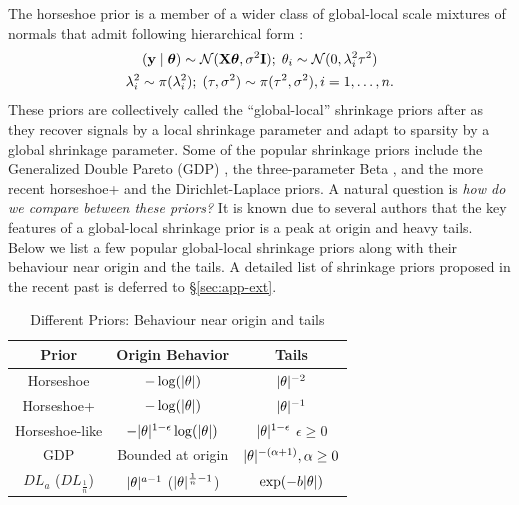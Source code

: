 \documentclass[11pt]{article}
\begin{document}
%
The horseshoe prior is a member of a wider class of global-local scale mixtures of normals that admit following hierarchical form \citep{polson2010shrink}: 
\begin{gather*}
({\bf y} \mid \boldsymbol{\theta}) \sim {\cal N}({\bf X} \boldsymbol{\theta}, \sigma^2 {\bf I}) ;\; \theta_i \sim {\cal N}(0, \lambda_i^2 \tau^2) \\
\lambda_i^2 \sim \pi(\lambda_i^2) ; \; (\tau,\sigma^2) \sim  \pi(\tau^2,\sigma^2), i = 1, \ldots, n. 
\end{gather*}
These priors are collectively called the ``global-local'' shrinkage priors after \cite{polson2010shrink} as they recover signals by a local shrinkage parameter and adapt to sparsity by a global shrinkage parameter. Some of the popular shrinkage priors include the Generalized Double Pareto (GDP) \citep{armagan2013generalized}, the three-parameter Beta \citep{armagan2011generalized}, and the more recent horseshoe+ \citep{bhadra2015horseshoe+} and the Dirichlet-Laplace \citep{bhattacharya2014dirichlet} priors. A natural question is \textit{how do we compare between these priors?} It is known due to several authors \citep[e.g.]{polson2010shrink,bhadra2015default,van2015conditions} that the key features of a global-local shrinkage prior is a peak at origin and heavy tails. Below we list a few popular global-local shrinkage priors along with their behaviour near origin and the tails. A detailed list of shrinkage priors proposed in the recent past is deferred to \S \ref{sec:app-ext}.

\begin{table}%
\centering
\begin{tabular}{| c | c |c |}
\hline
Prior & Origin Behavior & Tails \\
\hline 
Horseshoe & $-\log(\lvert\theta\rvert)$ & $\lvert\theta\rvert^{-2}$ \\
Horseshoe+ & $-\log(\lvert\theta\rvert)$ & $\lvert\theta\rvert^{-1}$ \\
Horseshoe-like & $-\lvert\theta\rvert^{1-\epsilon}\log(\lvert\theta\rvert)$ & $\lvert\theta\rvert^{1-\epsilon}$ $\epsilon \ge 0$\\
GDP & Bounded at origin & $\lvert\theta\rvert^{-(\alpha + 1)}, \alpha \ge 0$ \\
$DL_{a}$ ($DL_{\frac{1}{n}}$) & $\lvert\theta\rvert^{a-1}$ ($\lvert\theta\rvert^{\frac{1}{n}-1}$) & $\exp(-b\lvert\theta\rvert)$ \\
\hline
\end{tabular}
\caption{Different Priors: Behaviour near origin and tails}
\label{tab:priors}
\end{table}
\end{document}
